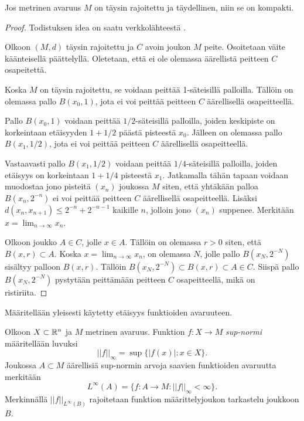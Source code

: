 \documentclass[12pt,oneside,a4paper]{amsbook} %
\begin{document}
\begin{theorem}\label{thm:compactness}
    Jos metrinen avaruus $M$ on täysin rajoitettu ja täydellinen, niin se on kompakti.
\end{theorem}
\begin{proof}
Todistuksen idea on saatu verkkolähteestä \cite{gibara}.

Olkoon $(M, d)$ täysin rajoitettu ja $C$ avoin joukon $M$ peite. Osoitetaan väite käänteisellä päättelyllä. Oletetaan, että ei ole olemassa äärellistä peitteen $C$ osapeitettä.

Koska $M$ on täysin rajoitettu, se voidaan peittää 1-säteisillä palloilla. Tällöin on olemassa pallo $B(x_0,1)$, jota ei voi peittää peitteen $C$ äärellisellä osapeitteellä.

Pallo $B(x_0,1)$ voidaan peittää $1/2$-säteisillä palloilla, joiden keskipiste on korkeintaan etäisyyden $1 + 1/2$ päästä pisteestä $x_0$. Jälleen on olemassa pallo $B(x_1, 1/2)$, jota ei voi peittää peitteen $C$ äärellisellä osapeitteellä.

Vastaavasti pallo $B(x_1, 1/2)$ voidaan peittää $1/4$-säteisillä palloilla, joiden etäisyys on korkeintaan $1+1/4$ pisteestä $x_1$. Jatkamalla tähän tapaan voidaan muodostaa jono pisteitä $(x_n)$ joukossa $M$ siten, että yhtäkään palloa $B(x_n, 2^{-n})$ ei voi peittää peitteen $C$ äärellisellä osapeitteellä. Lisäksi $d(x_n, x_{n+1})  \le 2^{-n} + 2^{-n-1}$ kaikille $n$, jolloin jono $(x_n)$ suppenee. Merkitään $x = \lim_{n\to\infty} x_n$.

Olkoon joukko $A \in C$, jolle $x \in A$. Tällöin on olemassa $r > 0$ siten, että $B(x,r) \subset A$. Koska $x = \lim_{n\to\infty} x_n$, on olemassa $N$, jolle pallo $B(x_N, 2^{-N})$ sisältyy palloon $B(x, r)$. Tällöin $B(x_N, 2^{-N}) \subset B(x, r) \subset A \in C$. Siispä pallo $B(x_N, 2^{-N})$ pystytään peittämään peitteen $C$ osapeitteellä, mikä on ristiriita.
\end{proof}

Määritellään yleisesti käytetty etäisyys funktioiden avaruuteen.
\begin{definition}
Olkoon $X\subset \mathbb{R}^n$ ja $M$ metrinen avaruus. Funktion $f: X \to M$ \textit{sup-normi} määritellään luvuksi
\begin{equation*}
    ||f||_\infty = \sup\{|f(x)| : x \in X\}.
\end{equation*}
Joukossa $A\subset M$ äärellisiä sup-normin arvoja saavien funktioiden avaruutta merkitään
    \[L^\infty (A) = \{f:A\to M \colon  ||f||_\infty < \infty\}.\] 
Merkinnällä $||f||_{L^\infty(B)}$ rajoitetaan funktion määrittelyjoukon tarkastelu joukkoon $B$.
\end{definition}
\end{document}

